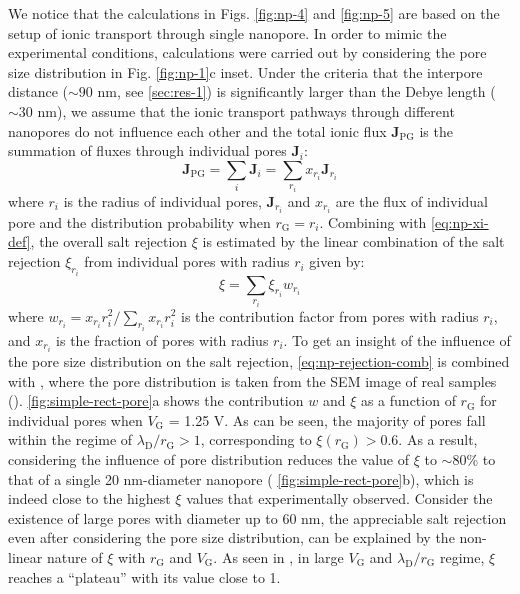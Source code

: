   We notice that the calculations in Figs. \autoref{fig:np-4} and
  \autoref{fig:np-5} are based on the setup of ionic transport through
  single nanopore.  In order to mimic the experimental conditions,
  calculations were carried out by considering the pore size
  distribution in Fig. \autoref{fig:np-1}c inset.  Under the criteria
  that the inter\-pore distance ($\sim{}90$ nm, see
  \autoref{sec:res-1}) is significantly larger than the Debye length
  ($\sim{}30$ nm), we assume that the ionic transport pathways through
  different nanopores do not influence each other and the total ionic
  flux $\symbf{J}_{\mathrm{PG}}$ is the summation of fluxes through
  individual pores $\symbf{J}_{i}$:
\begin{equation}
\label{eq:np-J-total}
\symbf{J}_{\mathrm{PG}} = \sum_{i} \symbf{J}_{i} = \sum_{r_{i}} x_{r_{i}} \symbf{J}_{r_{i}}
\end{equation}
where $r_{i}$ is the radius of individual pores,
$\symbf{J}_{r_{i}}$ and $x_{r_{i}}$ are the flux of individual
pore and the distribution probability when
$r_{\mathrm{G}} = r_{i}$.
%
Combining with \autoref{eq:np-xi-def}, the overall salt rejection
$\xi$ is estimated by the linear combination of the salt rejection
$\xi_{r_i}$ from individual pores with radius $r_i$ given by:
\begin{equation}
\label{eq:np-rejection-comb}
\xi = \sum_{r_{i}} \xi_{r_{i}} w_{r_{i}}
\end{equation}
where
$w_{r_{i}} = x_{r_{i}} r_{i}^{2} / \sum_{r_{i}} x_{r_{i}} r_{i}^{2} $
is the contribution factor from pores with radius $r_{i}$, and
$x_{r_{i}}$ is the fraction of pores with radius $r_{i}$.
%
To get an insight of the influence of the pore size distribution on
the salt rejection, \autoref{eq:np-rejection-comb} is combined with , where
the pore distribution is taken from the SEM image of real samples ().
%
\autoref{fig:simple-rect-pore}a shows the contribution $w$ and $\xi$ as
a function of $r_{\mathrm{G}}$ for individual pores when
$V_{\mathrm{G}}$ = 1.25 V. As can be seen, the majority of pores fall
within the regime of $\lambda_{\mathrm{D}} / r_{\mathrm{G}} > 1$,
corresponding to $\xi(r_{\mathrm{G}}) > 0.6$. As a result, considering
the influence of pore distribution reduces the value of $\xi$ to $\sim{}$80\% to
that of a single 20 nm-diameter nanopore (
\autoref{fig:simple-rect-pore}b), which is indeed close to the highest
$\xi$ values that experimentally observed.
%
Consider the
existence of large pores with diameter up to 60 nm, the appreciable salt rejection even after considering the pore size
distribution, can be explained by the non-linear nature of $\xi$ with
$r_{\mathrm{G}}$ and $V_{\mathrm{G}}$. As seen in , in large $V_{\mathrm{G}}$ and
$\lambda_{\mathrm{D}} / r_{\mathrm{G}}$ regime, $\xi$ reaches a
``plateau'' with its value close to 1.

